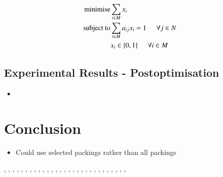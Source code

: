 \documentclass{elsarticle}
\begin{document}
\begin{align*}
\text{minimise} &\sum_{i \in M} x_i \\
\text{subject to} &\sum_{i \in M} a_{ij} x_i = 1 \hspace{5mm} \forall j \in N \\
&x_i \in \{0,1\} \hspace{5mm} \forall i \in M
\end{align*}

\subsection{Experimental Results - Postoptimisation}
\label{sub:exppostopt}
\begin{itemize}
	\item
\end{itemize}

\section{Conclusion}
\label{sec:conclusion}
\begin{itemize}
	\item Could use selected packings rather than all packings
\end{itemize}

	

\cite{becker2010}, \cite{becker2015}, \cite{coffman1978}, \cite{coffman1984}, \cite{dosa2007} \cite{eilon1971} \cite{falkenauer1992} \cite{falkenauer1996}, \cite{garey1972}, \cite{garey1979}, \cite{garraffa2016}, \cite{gilmore1961}, \cite{gilmore1963}, \cite{goulimis2004}, \cite{haggkvist1977}, \cite{hawa2018}, \cite{hung1978}, \cite{johnson1973}, \cite{johnson1974fast}, \cite{johnson1974worst}, \cite{karp1972}, \cite{knuth2000}, \cite{korf2002}, \cite{levine2004}, \cite{lewis2009}, \cite{lewis2011}, \cite{lewis2017}, \cite{mahadev1994}, \cite{mahadev1995}, \cite{malaguti2008}, \cite{martello1990k}, \cite{martello1990l}, \cite{quiroz2015}



\end{document}
